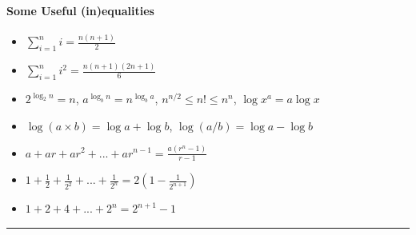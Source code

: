 \documentclass[12pt]{article}
\begin{document}
\paragraph{Some Useful (in)equalities}
\begin{itemize}
    \item $\sum_{i=1}^n i= \frac{n(n+1)}{2}$
    \item $\sum_{i=1}^ni^2 = \frac{n(n+1)(2n+1)}{6}$
    \item $2^{\log_2n}=n$, $a^{\log_bn}=n^{\log_ba}$, $n^{n/2}\leq n! \leq n^n$, $\log x^a = a\log x$
    \item $\log (a\times b) = \log a + \log b$, $\log(a/b) = \log a - \log b$
    \item $a + ar + ar^2 + ... + ar^{n-1} = \frac{a(r^n-1)}{r-1}$
    \item $1 + \frac{1}{2} + \frac{1}{2^2} + ... + \frac{1}{2^n} = 2(1-\frac{1}{2^{n+1}})$
    \item $1 + 2 + 4 + ... + 2^n = 2^{n+1}-1$
\end{itemize}


\hrule

\newpage
\end{document}
